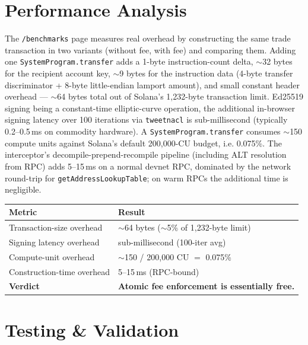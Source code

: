 \documentclass[11pt,a4paper]{article}
\begin{document}
\section{Performance Analysis}

The \texttt{/benchmarks} page measures real overhead by constructing the same trade transaction in two variants (without fee, with fee) and comparing them. Adding one \texttt{SystemProgram.transfer} adds a 1-byte instruction-count delta, $\sim$32 bytes for the recipient account key, $\sim$9 bytes for the instruction data (4-byte transfer discriminator + 8-byte little-endian lamport amount), and small constant header overhead --- $\sim$64 bytes total out of Solana's 1{,}232-byte transaction limit. Ed25519 signing being a constant-time elliptic-curve operation, the additional in-browser signing latency over 100 iterations via \texttt{tweetnacl} is sub-millisecond (typically 0.2--0.5\,ms on commodity hardware). A \texttt{SystemProgram.transfer} consumes $\sim$150 compute units against Solana's default 200{,}000-CU budget, i.e. 0.075\%. The interceptor's decompile-prepend-recompile pipeline (including ALT resolution from RPC) adds 5--15\,ms on a normal devnet RPC, dominated by the network round-trip for \texttt{getAddressLookupTable}; on warm RPCs the additional time is negligible.

\begin{center}
\begin{tabular}{l l}
\toprule
\textbf{Metric} & \textbf{Result} \\
\midrule
Transaction-size overhead & $\sim$64 bytes ($\sim$5\% of 1{,}232-byte limit) \\
Signing latency overhead & sub-millisecond (100-iter avg) \\
Compute-unit overhead & $\sim$150 / 200{,}000 CU $=$ 0.075\% \\
Construction-time overhead & 5--15\,ms (RPC-bound) \\
\midrule
\textbf{Verdict} & \textbf{Atomic fee enforcement is essentially free.} \\
\bottomrule
\end{tabular}
\end{center}

\section{Testing \& Validation}
\end{document}
